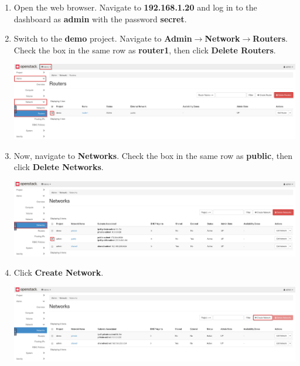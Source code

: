 \documentclass[letterpaper, 12pt]{article}
\begin{document}
\begin{enumerate}
    \item Open the web browser. Navigate to \textbf{192.168.1.20} and log in to the dashboard as \textbf{admin}
    with the password \textbf{secret}.

    \item Switch to the \textbf{demo} project. Navigate to \textbf{Admin$\rightarrow$Network$\rightarrow$Routers}. Check
    the box in the same row as \textbf{router1}, then click \textbf{Delete Routers}.

    \begin{center}
        \includegraphics[width=\linewidth]{images/part1/step2.png}
    \end{center}

    \item Now, navigate to \textbf{Networks}. Check the box in the same row as \textbf{public}, then click
    \textbf{Delete Networks}.

    \begin{center}
        \includegraphics[width=\linewidth]{images/part1/step3.png}
    \end{center}

    \item Click \textbf{Create Network}.
    
    \begin{center}
        \includegraphics[width=\linewidth]{images/part1/step4.png}
    \end{center}
    

\end{enumerate}
\end{document}
